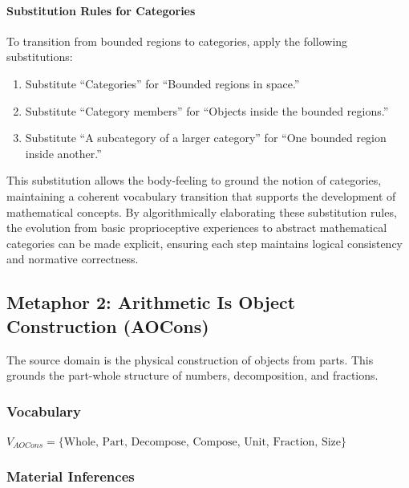 \documentclass[12pt]{book}
\begin{document}
\paragraph{Substitution Rules for Categories}

To transition from bounded regions to categories, apply the following substitutions:

\begin{enumerate}
    \item Substitute ``Categories'' for ``Bounded regions in space.''
    \item Substitute ``Category members'' for ``Objects inside the bounded regions.''
    \item Substitute ``A subcategory of a larger category'' for ``One bounded region inside another.''
\end{enumerate}

This substitution allows the body-feeling to ground the notion of categories, maintaining a coherent vocabulary transition that supports the development of mathematical concepts. By algorithmically elaborating these substitution rules, the evolution from basic proprioceptive experiences to abstract mathematical categories can be made explicit, ensuring each step maintains logical consistency and normative correctness.





\subsection{Metaphor 2: Arithmetic Is Object Construction (AOCons)}

The source domain is the physical construction of objects from parts. This grounds the part-whole structure of numbers, decomposition, and fractions.

\subsubsection{Vocabulary}
$V_{AOCons} = \{\text{Whole, Part, Decompose, Compose, Unit, Fraction, Size}\}$

\subsubsection{Material Inferences}
\end{document}
